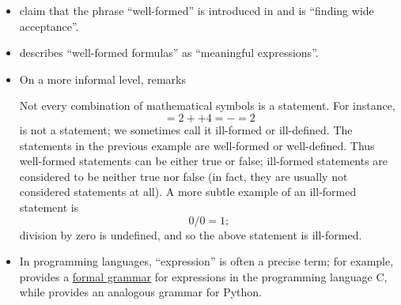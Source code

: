 \begin{comments}
\begin{itemize}
\begin{displayquote}
      To emphasize this, many authors call them \enquote{well-formed formulas} or \enquote{wffs}. (To be consistent, if we did so here, we ought to say also \enquote{well-formed terms} or \enquote{wfts}, and \enquote{well-formed proofs} or \enquote{wfps}.) We find \enquote{well-formed formulas} and \enquote{wffs} a little aneuphonious (unwell-sounding). So we prefer, after the well-taken point has been
      well"-emphasized, to say simply \enquote{formulas} (following Hilbert and Bernays 1934, 1939). For the infrequently needed arbitrary finite sequences of formal symbols, we have the longer name \enquote{formal expressions}.
    \end{displayquote}

    \item {} claim that the phrase \enquote{well-formed} is introduced in  and is \enquote{finding wide acceptance}.

    \item {} describes \enquote{well-formed formulas} as \enquote{meaningful expressions}.

    \item On a more informal level,  remarks
    \begin{displayquote}
      Not every combination of mathematical symbols is a statement. For instance,
      \begin{equation*}
        = 2 ++ 4 = - = 2
      \end{equation*}
      is not a statement; we sometimes call it ill-formed or ill-defined. The statements in the previous example are well-formed or well-defined. Thus well-formed statements can be either true or false; ill-formed statements are considered to be neither true
      nor false (in fact, they are usually not considered statements at all). A more subtle example of an ill-formed statement is
      \begin{equation*}
        0 / 0 = 1;
      \end{equation*}
      division by zero is undefined, and so the above statement is ill-formed.
    \end{displayquote}

    \item In programming languages, \enquote{expression} is often a precise term; for example, \cite[\S 6.5]{ISO:9899:2018} provides a \hyperref[def:formal_grammar]{formal grammar} for expressions in the programming language C, while \cite{PythonDocs:3.13:expressions} provides an analogous grammar for Python.


\end{itemize}
\end{comments}
